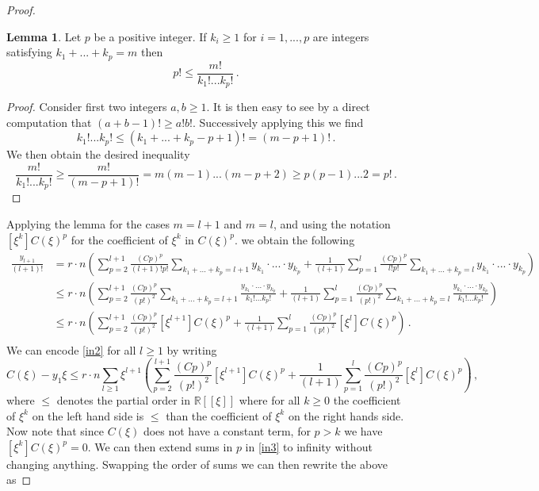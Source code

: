\documentclass{article}
\theoremstyle{definition}
\newtheorem{lemma}[theorem]{Lemma}
\numberwithin{equation}{section}
\begin{document}
\begin{proof}
\begin{lemma}Let $p$ be a positive integer. If $k_i\geq 1$ for $i=1,...,p$ are integers satisfying $k_1+...+k_p=m$ then
\begin{equation*}
    p!\leq \frac{m!}{k_1!...k_p!}\,.
\end{equation*}
\end{lemma}
\begin{proof}
Consider first two integers $a,b\geq 1$. It is then easy to see by a direct computation that $(a+b-1)!\geq a!b!$. Successively applying this we find
\begin{equation*}
k_1!...k_p!\leq (k_1+...+k_p-p+1)!=(m-p+1)!\,.
\end{equation*}
We then obtain the desired inequality
\begin{equation*}
\frac{m!}{k_1!...k_p!}\geq \frac{m!}{(m-p+1)!}=m(m-1)...(m-p+2)\geq p(p-1)...2=p!\,.
\end{equation*}
\end{proof}
Applying the lemma for the cases $m=l+1$ and $m=l$, and using the notation $[\xi^k]C(\xi)^p$ for the coefficient of $\xi^k$ in $C(\xi)^p$. we obtain the following 
\begin{equation}\label{in2}
\begin{split}
    \frac{y_{l+1}}{(l+1)!}&=r\cdot n\left(\sum_{p=2}^{l+1}\frac{(Cp)^p}{(l+1)!p!}\sum_{k_1+...+k_p=l+1}y_{k_1}\cdot...\cdot y_{k_p}+\frac{1}{(l+1)}\sum_{p=1}^{l}\frac{(Cp)^p}{l!p!}\sum_{k_1+...+k_p=l}y_{k_1}\cdot...\cdot y_{k_p}\right)\\
    &\leq r\cdot n\left(\sum_{p=2}^{l+1}\frac{(Cp)^p}{(p!)^2}\sum_{k_1+...+k_p=l+1}\frac{y_{k_1}\cdot...\cdot y_{k_p}}{k_1!...k_p!}+\frac{1}{(l+1)}\sum_{p=1}^{l}\frac{(Cp)^p}{(p!)^2}\sum_{k_1+...+k_p=l}\frac{y_{k_1}\cdot...\cdot y_{k_p}}{k_1!...k_p!}\right)\\
    &\leq r\cdot n\left(\sum_{p=2}^{l+1}\frac{(Cp)^p}{(p!)^2}[\xi^{l+1}]C(\xi)^p+\frac{1}{(l+1)}\sum_{p=1}^{l}\frac{(Cp)^p}{(p!)^2}[\xi^l]C(\xi)^p\right)\,.\\
\end{split}
\end{equation}
We can encode \eqref{in2} for all $l\geq 1$ by writing 
\begin{equation}\label{in3}
    C(\xi)-y_1\xi \leq r\cdot n\sum_{l\geq 1}\xi^{l+1}\left(\sum_{p=2}^{l+1}\frac{(Cp)^p}{(p!)^2}[\xi^{l+1}]C(\xi)^p+\frac{1}{(l+1)}\sum_{p=1}^{l}\frac{(Cp)^p}{(p!)^2}[\xi^l]C(\xi)^p\right)\,,
\end{equation}
where $\leq$ denotes the partial order in  $\mathbb{R}[[\xi]]$ where for all  $k\geq 0$ the coefficient of $\xi^k$ on the left hand side is $\leq$ than the coefficient of $\xi^k$ on the right hands side. Now note that since $C(\xi)$ does not have a constant term, for $p>k$ we have $[\xi^k]C(\xi)^p=0$. We can then extend sums in $p$ in \eqref{in3} to infinity without changing anything.  
Swapping the order of sums we can then rewrite the above as 


\end{proof}
\end{document}
